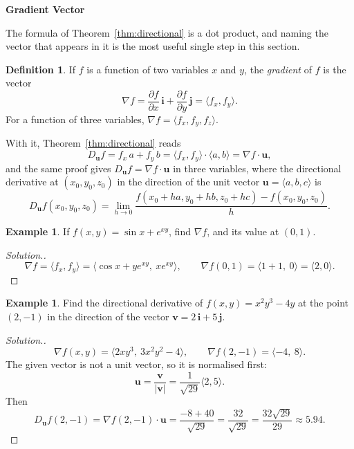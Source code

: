 \documentclass[11pt,a4paper]{article}
\theoremstyle{definition}
\newtheorem{defn}[thm]{Definition}
\newtheorem{exa}[thm]{Example}
\newenvironment{solution}
  {\renewcommand{\qedsymbol}{}\begin{proof}[\textit{Solution}.]}
  {\end{proof}}
\newcommand{\subhead}[1]{%
  \par\medskip\noindent\textbf{#1}\par\nobreak\smallskip}
\begin{document}
\subhead{Gradient Vector}

The formula of Theorem~\ref{thm:directional} is a dot product, and naming the
vector that appears in it is the most useful single step in this section.

\begin{defn}
\label{defn:gradient}
If $f$ is a function of two variables $x$ and $y$, the \emph{gradient} of $f$ is
the vector
\[\nabla f = \frac{\partial f}{\partial x}\,\mathbf i +\frac{\partial f}{\partial
y}\,\mathbf j = \langle f_x , f_y\rangle .\]
For a function of three variables,
$\nabla f = \langle f_x, f_y, f_z\rangle$.
\end{defn}

With it, Theorem~\ref{thm:directional} reads
\[D_{\mathbf u}f = f_x\, a + f_y\, b = \langle f_x , f_y\rangle \cdot \langle
a,b\rangle = \nabla f\cdot\mathbf u ,\]
and the same proof gives $D_{\mathbf u}f = \nabla f\cdot\mathbf u$ in three
variables, where the directional derivative at $(x_0,y_0,z_0)$ in the direction
of the unit vector $\mathbf u = \langle a,b,c\rangle$ is
\[D_{\mathbf u}f(x_0,y_0,z_0) = \lim_{h\to 0}\frac{f(x_0 + ha, y_0 + hb, z_0 +
hc) - f(x_0,y_0,z_0)}{h} .\]

\begin{exa}
\label{ex:gradsin}
If $f(x,y) = \sin x + e^{xy}$, find $\nabla f$, and its value at $(0,1)$.
\end{exa}

\begin{solution}
\[\nabla f = \langle f_x, f_y\rangle = \langle \cos x + ye^{xy},\ xe^{xy}\rangle,
\qquad \nabla f (0,1) = \langle 1 + 1,\ 0\rangle = \langle 2,0\rangle .\]
\end{solution}

\begin{exa}
\label{ex:dirvector}
Find the directional derivative of $f(x,y) = x^2y^3 -4y$ at the point $(2,-1)$
in the direction of the vector $\mathbf v = 2\,\mathbf i + 5\,\mathbf j$.
\end{exa}

\begin{solution}
\[\nabla f (x,y) = \langle 2xy^3,\ 3x^2y^2 -4\rangle ,\qquad \nabla f (2,-1) =
\langle -4,\ 8\rangle .\]
The given vector is not a unit vector, so it is normalised first:
\[\mathbf u = \frac{\mathbf v}{|\mathbf v|} = \frac{1}{\sqrt{29}}\langle 2,
5\rangle .\]
Then
\[D_{\mathbf u}f(2,-1) = \nabla f (2,-1)\cdot\mathbf u = \frac{-8 + 40}{\sqrt{29}}
= \frac{32}{\sqrt{29}} = \frac{32\sqrt{29}}{29}\approx 5.94 .\]
\end{solution}
\end{document}
